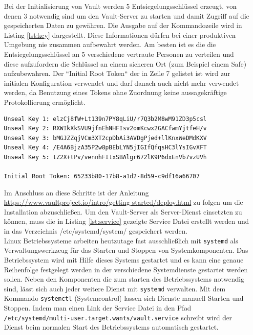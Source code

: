 \documentclass[
book,
a4paper,   
titlepage,  
halfparskip,
12pt        
]{scrartcl}
\newcommand\inline{\lstinline[basicstyle=\ttfamily]}
\begin{document}
\begin{onehalfspacing}
Bei der Initialisierung von Vault werden 5 Entsiegelungsschlüssel erzeugt, von denen 3 notwendig sind um den Vault-Server zu starten und damit Zugriff auf die gespeicherten Daten zu gewähren. Die Ausgabe auf der Kommandozeile wird in Listing \vref{lst:key} dargestellt.
Diese Informationen dürfen bei einer produktiven Umgebung nie zusammen aufbewahrt werden. Am besten ist es die die Entsiegelungsschlüssel an 5 verschiedene vertraute Personen zu verteilen und diese aufzufordern die Schlüssel an einem sicheren Ort (zum Beispiel einem Safe) aufzubewahren. Der ``Initial Root Token`` der in Zeile 7 gelistet ist wird zur initialen Konfiguration verwendet und darf danach auch nicht mehr verwendet werden, da Benutzung eines Tokens ohne Zuordnung keine aussagekräftige Protokollierung ermöglicht.

\begin{lstlisting}[caption={[Initialisierung Vault] Ausgabe der 5 Schlüsselfragmente von denen 3 nötig sind um den Hauptschlüssel zu rekonstruieren}, label=lst:key, captionpos=b, basicstyle=\ttfamily]
Unseal Key 1: elzCj8fW+Lt139n7PY8qLiU/r7Q3b2M8wM91ZD3p5csl
Unseal Key 2: RXWIkXkSVU9jfnEhNHFIsv2omKcwx2GACfwmYjtfeH/v
Unseal Key 3: bMGJZZqjVCm3XT2cpDbAi3AVDgPjed+llKnxWeDMdKXV
Unseal Key 4: /E4A6BjzA35P2w8pBEbLYN5jIGIfQfqsHC3lYsIGvXFT
Unseal Key 5: tZ2X+tPv/vennhFItxSBAlgr672lK9P6dxEnVb7vzUVh

Initial Root Token: 65233b80-17b8-a1d2-8d59-c9df16a66707

\end{lstlisting}


Im Anschluss an diese Schritte ist der Anleitung \url{https://www.vaultproject.io/intro/getting-started/deploy.html} zu folgen um die Installation abzuschließen. Um den Vault-Server als Server-Dienst einsetzten zu können, muss die in Listing \vref{lst:service} gezeigte Service Datei erstellt werden und in das Verzeichnis /etc/systemd/system/ gespeichert werden.\\
Linux Betriebssysteme arbeiten heutzutage fast ausschließlich mit \inline|systemd| als Verwaltungswerkzeug für das Starten und Stoppen von Systemkomponenten. Das Betriebssystem wird mit Hilfe dieses Systems gestartet und es kann eine genaue Reihenfolge festgelegt werden in der verschiedene Systemdienste gestartet werden sollen. Neben den Komponenten die zum starten des Betriebssystems notwendig sind, lässt sich auch jeder weitere Dienst mit \inline|systemd| verwalten. Mit dem Kommando \inline|systemctl| (Systemcontrol) lassen sich Dienste manuell Starten und Stoppen. Indem man einen Link der Service Datei in den Pfad \inline|/etc/systemd/multi-user.target.wants/vault.service| schreibt wird der Dienst beim normalen Start des Betriebssystems automatisch gestartet.\cite{systemd}


\end{onehalfspacing}
\end{document}
